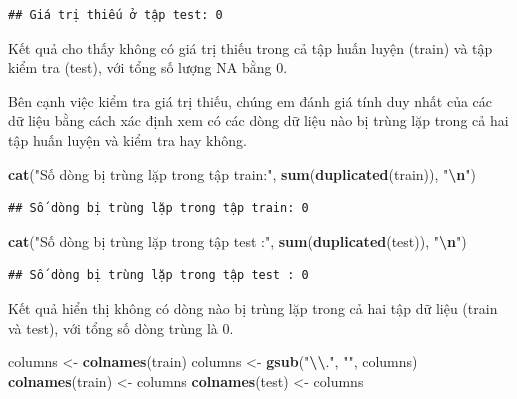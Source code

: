 \documentclass[
]{article}
\newenvironment{Shaded}{\begin{snugshade}}{\end{snugshade}}
\newcommand{\FunctionTok}[1]{\textcolor[rgb]{0.13,0.29,0.53}{\textbf{#1}}}
\newcommand{\NormalTok}[1]{#1}
\newcommand{\OtherTok}[1]{\textcolor[rgb]{0.56,0.35,0.01}{#1}}
\newcommand{\SpecialCharTok}[1]{\textcolor[rgb]{0.81,0.36,0.00}{\textbf{#1}}}
\newcommand{\StringTok}[1]{\textcolor[rgb]{0.31,0.60,0.02}{#1}}
\begin{document}
\begin{verbatim}
## Giá trị thiếu ở tập test: 0
\end{verbatim}

Kết quả cho thấy không có giá trị thiếu trong cả tập huấn luyện (train)
và tập kiểm tra (test), với tổng số lượng NA bằng 0.

Bên cạnh việc kiểm tra giá trị thiếu, chúng em đánh giá tính duy nhất
của các dữ liệu bằng cách xác định xem có các dòng dữ liệu nào bị trùng
lặp trong cả hai tập huấn luyện và kiểm tra hay không.

\begin{Shaded}
\begin{Highlighting}[]
\FunctionTok{cat}\NormalTok{(}\StringTok{"Số dòng bị trùng lặp trong tập train:"}\NormalTok{, }\FunctionTok{sum}\NormalTok{(}\FunctionTok{duplicated}\NormalTok{(train)), }\StringTok{"}\SpecialCharTok{\textbackslash{}n}\StringTok{"}\NormalTok{)}
\end{Highlighting}
\end{Shaded}

\begin{verbatim}
## Số dòng bị trùng lặp trong tập train: 0
\end{verbatim}

\begin{Shaded}
\begin{Highlighting}[]
\FunctionTok{cat}\NormalTok{(}\StringTok{"Số dòng bị trùng lặp trong tập test :"}\NormalTok{, }\FunctionTok{sum}\NormalTok{(}\FunctionTok{duplicated}\NormalTok{(test)), }\StringTok{"}\SpecialCharTok{\textbackslash{}n}\StringTok{"}\NormalTok{)}
\end{Highlighting}
\end{Shaded}

\begin{verbatim}
## Số dòng bị trùng lặp trong tập test : 0
\end{verbatim}

Kết quả hiển thị không có dòng nào bị trùng lặp trong cả hai tập dữ liệu
(train và test), với tổng số dòng trùng là 0.

\begin{Shaded}
\begin{Highlighting}[]
\NormalTok{columns }\OtherTok{\textless{}{-}} \FunctionTok{colnames}\NormalTok{(train)}
\NormalTok{columns }\OtherTok{\textless{}{-}} \FunctionTok{gsub}\NormalTok{(}\StringTok{"}\SpecialCharTok{\textbackslash{}\textbackslash{}}\StringTok{."}\NormalTok{, }\StringTok{""}\NormalTok{, columns)}
\FunctionTok{colnames}\NormalTok{(train) }\OtherTok{\textless{}{-}}\NormalTok{ columns}
\FunctionTok{colnames}\NormalTok{(test) }\OtherTok{\textless{}{-}}\NormalTok{ columns}
\end{Highlighting}
\end{Shaded}
\end{document}
